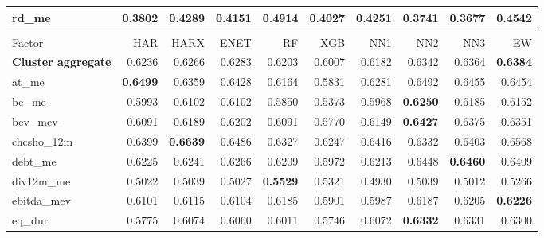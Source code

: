 \begin{longtable}{>{\raggedright\arraybackslash}p{2.6cm}rrrrrrrrr}
rd\_me & 0.3802 & \cellcolor{blue!10}0.4289 & \cellcolor{blue!10}0.4151 & \textbf{\cellcolor{blue!10}0.4914} & \cellcolor{blue!10}0.4027 & \cellcolor{blue!10}0.4251 & 0.3741 & 0.3677 & \cellcolor{blue!10}0.4542 \\
\hline
\multicolumn{10}{@{}l}{\textit{Panel M. Value}} \\
\hline
Factor & HAR & HARX & ENET & RF & XGB & NN1 & NN2 & NN3 & EW \\
\hline
\textbf{Cluster aggregate} & 0.6236 & \cellcolor{blue!10}0.6266 & \cellcolor{blue!10}0.6283 & 0.6203 & 0.6007 & 0.6182 & \cellcolor{blue!10}0.6342 & \cellcolor{blue!10}0.6364 & \textbf{\cellcolor{blue!10}0.6384} \\
at\_me & \textbf{0.6499} & 0.6359 & 0.6428 & 0.6164 & 0.5831 & 0.6281 & 0.6492 & 0.6455 & 0.6454 \\
be\_me & 0.5993 & \cellcolor{blue!10}0.6102 & \cellcolor{blue!10}0.6102 & 0.5850 & 0.5373 & 0.5968 & \textbf{\cellcolor{blue!10}0.6250} & \cellcolor{blue!10}0.6185 & \cellcolor{blue!10}0.6152 \\
bev\_mev & 0.6091 & \cellcolor{blue!10}0.6189 & \cellcolor{blue!10}0.6202 & \cellcolor{blue!10}0.6091 & 0.5770 & \cellcolor{blue!10}0.6149 & \textbf{\cellcolor{blue!10}0.6427} & \cellcolor{blue!10}0.6375 & \cellcolor{blue!10}0.6351 \\
chcsho\_12m & 0.6399 & \textbf{\cellcolor{blue!10}0.6639} & \cellcolor{blue!10}0.6486 & 0.6327 & 0.6247 & \cellcolor{blue!10}0.6416 & 0.6332 & \cellcolor{blue!10}0.6403 & \cellcolor{blue!10}0.6568 \\
debt\_me & 0.6225 & \cellcolor{blue!10}0.6241 & \cellcolor{blue!10}0.6266 & 0.6209 & 0.5972 & 0.6213 & \cellcolor{blue!10}0.6448 & \textbf{\cellcolor{blue!10}0.6460} & \cellcolor{blue!10}0.6409 \\
div12m\_me & 0.5022 & \cellcolor{blue!10}0.5039 & \cellcolor{blue!10}0.5027 & \textbf{\cellcolor{blue!10}0.5529} & \cellcolor{blue!10}0.5321 & 0.4930 & \cellcolor{blue!10}0.5039 & 0.5012 & \cellcolor{blue!10}0.5266 \\
ebitda\_mev & 0.6101 & \cellcolor{blue!10}0.6115 & \cellcolor{blue!10}0.6104 & \cellcolor{blue!10}0.6185 & 0.5901 & 0.5987 & \cellcolor{blue!10}0.6187 & \cellcolor{blue!10}0.6205 & \textbf{\cellcolor{blue!10}0.6226} \\
eq\_dur & 0.5775 & \cellcolor{blue!10}0.6074 & \cellcolor{blue!10}0.6060 & \cellcolor{blue!10}0.6011 & 0.5746 & \cellcolor{blue!10}0.6072 & \textbf{\cellcolor{blue!10}0.6332} & \cellcolor{blue!10}0.6331 & \cellcolor{blue!10}0.6300 \\

\end{longtable}
